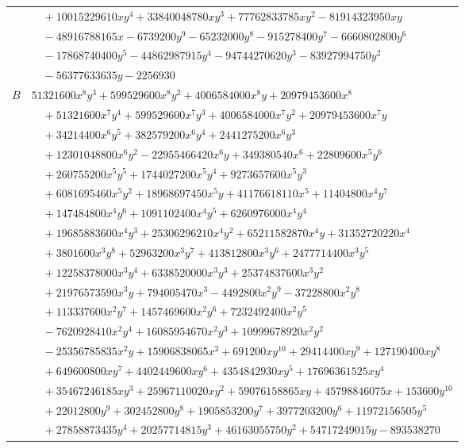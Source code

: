 \documentclass[11pt]{article}
\begin{document}
\begin{longtable}{@{}ll@{}}
 & $\quad +10015229610xy^{4}+33840048780xy^{3}+77762833785xy^{2}-81914323950xy$\\
 & $\quad -48916788165x-6739200y^{9}-65232000y^{8}-915278400y^{7}-6660802800y^{6}$\\
 & $\quad -17868740400y^{5}-44862987915y^{4}-94744270620y^{3}-83927994750y^{2}$\\
 & $\quad -56377633635y-2256930$\\
$B$ & $51321600x^{8}y^{3}+599529600x^{8}y^{2}+4006584000x^{8}y+20979453600x^{8}$\\
 & $\quad +51321600x^{7}y^{4}+599529600x^{7}y^{3}+4006584000x^{7}y^{2}+20979453600x^{7}y$\\
 & $\quad +34214400x^{6}y^{5}+382579200x^{6}y^{4}+2441275200x^{6}y^{3}$\\
 & $\quad +12301048800x^{6}y^{2}-22955466420x^{6}y+349380540x^{6}+22809600x^{5}y^{6}$\\
 & $\quad +260755200x^{5}y^{5}+1744027200x^{5}y^{4}+9273657600x^{5}y^{3}$\\
 & $\quad +6081695460x^{5}y^{2}+18968697450x^{5}y+41176618110x^{5}+11404800x^{4}y^{7}$\\
 & $\quad +147484800x^{4}y^{6}+1091102400x^{4}y^{5}+6260976000x^{4}y^{4}$\\
 & $\quad +19685883600x^{4}y^{3}+25306296210x^{4}y^{2}+65211582870x^{4}y+31352720220x^{4}$\\
 & $\quad +3801600x^{3}y^{8}+52963200x^{3}y^{7}+413812800x^{3}y^{6}+2477714400x^{3}y^{5}$\\
 & $\quad +12258378000x^{3}y^{4}+6338520000x^{3}y^{3}+25374837600x^{3}y^{2}$\\
 & $\quad +21976573590x^{3}y+794005470x^{3}-4492800x^{2}y^{9}-37228800x^{2}y^{8}$\\
 & $\quad +113337600x^{2}y^{7}+1457469600x^{2}y^{6}+7232492400x^{2}y^{5}$\\
 & $\quad -7620928410x^{2}y^{4}+16085954670x^{2}y^{3}+10999678920x^{2}y^{2}$\\
 & $\quad -25356785835x^{2}y+15906838065x^{2}+691200xy^{10}+29414400xy^{9}+127190400xy^{8}$\\
 & $\quad +649600800xy^{7}+4402449600xy^{6}+4354842930xy^{5}+17696361525xy^{4}$\\
 & $\quad +35467246185xy^{3}+25967110020xy^{2}+59076158865xy+45798846075x+153600y^{10}$\\
 & $\quad +22012800y^{9}+302452800y^{8}+1905853200y^{7}+3977203200y^{6}+11972156505y^{5}$\\
 & $\quad +27858873435y^{4}+20257714815y^{3}+46163055750y^{2}+54717249015y-893538270$\\

\end{longtable}
\end{document}
